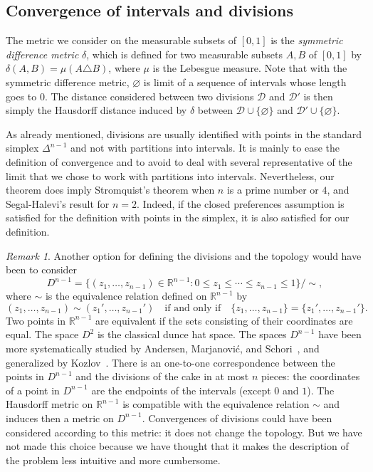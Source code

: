 \documentclass[12pt]{amsart}
\theoremstyle{definition}
\theoremstyle{remark}
\newtheorem*{remark}{Remark}
\def\D{\mathcal{D}}
\def\R{\mathbb{R}}
\begin{document}
\subsection*{Convergence of intervals and divisions}
The metric we consider on the measurable subsets of $[0,1]$ is the {\em symmetric difference metric} $\delta$, which is defined for two measurable subsets $A,B$ of $[0,1]$ by $\delta(A,B)=\mu(A\triangle B)$, where $\mu$ is the Lebesgue measure. Note that with the symmetric difference metric, $\varnothing$ is limit of a sequence of intervals whose length goes to $0$. The distance considered between two divisions $\D$ and $\D'$ is then simply the Hausdorff distance induced by $\delta$ between $\D\cup\{\varnothing\}$ and $\D'\cup\{\varnothing\}$.

As already mentioned, divisions are usually identified with points in the standard simplex $\Delta^{n-1}$ and not with partitions into intervals. It is mainly to ease the definition of convergence and to avoid to deal with several representative of the limit that we chose to work with partitions into intervals. Nevertheless, our theorem does imply Stromquist's theorem when $n$ is a prime number or $4$, and Segal-Halevi's result for $n=2$. Indeed, if the closed preferences assumption is satisfied for the definition with points in the simplex, it is also satisfied for our definition.

\begin{remark}
Another option for defining the divisions and the topology would have been to consider $$D^{n-1}=\big\{(z_1,\ldots,z_{n-1})\in\R^{n-1}\colon 0\leq z_1\leq\cdots\leq z_{n-1}\leq 1\big\}/\sim,$$ where $\sim$ is the equivalence relation defined on $\R^{n-1}$ by $$(z_1,\ldots,z_{n-1})\sim(z_1',\ldots,z_{n-1}')\quad\mbox{if and only if}\quad \{z_1,\ldots,z_{n-1}\}=\{z_1',\ldots,z_{n-1}'\}.$$ Two points in $\R^{n-1}$ are equivalent if the sets consisting of their coordinates are equal. The space $D^{2}$ is the classical dunce hat space. The spaces $D^{n-1}$ have been more systematically studied by Andersen, Marjanovi\'c, and Schori~\cite{andersen1993symmetric}, and generalized by Kozlov~\cite{koz}.  %
There is an one-to-one correspondence between the points in $D^{n-1}$ and the divisions of the cake in at most $n$ pieces: the coordinates of a point in $D^{n-1}$ are the endpoints of the intervals (except $0$ and $1$). The Hausdorff metric on $\R^{n-1}$ is compatible with the equivalence relation $\sim$ and induces then a metric on $D^{n-1}$. Convergences of divisions could have been considered according to this metric: it does not change the topology. But we have not made this choice because we have thought that it makes the description of the problem less intuitive and more cumbersome.
\end{remark}
\end{document}
